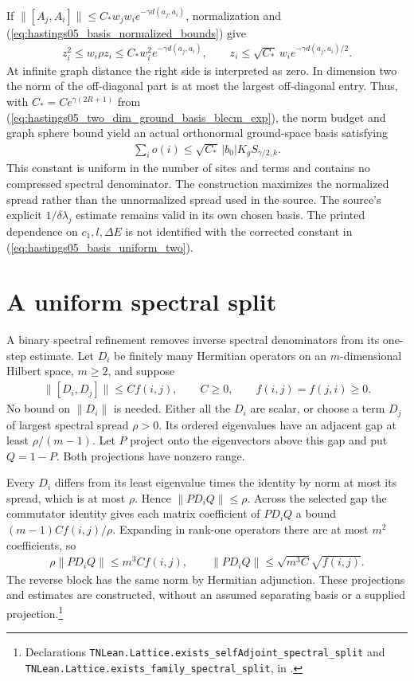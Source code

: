 \documentclass{article}
\providecommand{\leanid}[1]{\nolinkurl{#1}}
\begin{document}
If $\|[A_j,A_i]\|\le C_*w_jw_i e^{-\gamma d(a_j,a_i)}$, normalization and
(\ref{eq:hastings05_basis_normalized_bounds}) give
\begin{align}
 z_i^2\le w_i\rho z_i\le C_*w_i^2e^{-\gamma d(a_j,a_i)},
 \qquad z_i\le\sqrt{C_*}\,w_i e^{-\gamma d(a_j,a_i)/2}.
 \label{eq:hastings05_basis_half_decay}
\end{align}
At infinite graph distance the right side is interpreted as zero. In dimension
two the norm of the off-diagonal part is at most the largest off-diagonal entry.
Thus, with $C_*=Ce^{\gamma(2R+1)}$ from
(\ref{eq:hastings05_two_dim_ground_basis_blecm_exp}), the norm budget and graph
sphere bound yield an actual orthonormal ground-space basis satisfying
\begin{align}
 \sum_i o(i)\le\sqrt{C_*}\,|b_0|K_g S_{\gamma/2,k}.
 \label{eq:hastings05_basis_uniform_two}
\end{align}
This constant is uniform in the number of sites and terms and contains no
compressed spectral denominator. The construction maximizes the normalized
spread rather than the unnormalized spread used in the source. The source's
explicit $1/\delta\lambda_j$ estimate remains valid in its own chosen basis.
The printed dependence on $c_1,l,\Delta E$ is not identified with the corrected
constant in (\ref{eq:hastings05_basis_uniform_two}).

\section{A uniform spectral split}

A binary spectral refinement removes inverse spectral denominators from its
one-step estimate. Let $D_i$ be finitely many Hermitian operators on an
$m$-dimensional Hilbert space, $m\ge2$, and suppose
\begin{align}
 \|[D_i,D_j]\|\le C f(i,j),\qquad C\ge0,\qquad f(i,j)=f(j,i)\ge0.
 \label{eq:hastings05_basis_split_commutators}
\end{align}
No bound on $\|D_i\|$ is needed. Either all the $D_i$ are scalar, or choose a
term $D_j$ of largest spectral spread $\rho>0$. Its ordered eigenvalues have
an adjacent gap at least $\rho/(m-1)$. Let $P$ project onto the eigenvectors
above this gap and put $Q=1-P$. Both projections have nonzero range.

Every $D_i$ differs from its least eigenvalue times the identity by norm at
most its spread, which is at most $\rho$. Hence $\|PD_iQ\|\le\rho$.
Across the selected gap the commutator identity gives each matrix coefficient
of $PD_iQ$ a bound $(m-1)C f(i,j)/\rho$. Expanding in rank-one operators
there are at most $m^2$ coefficients, so
\begin{align}
 \rho\|PD_iQ\|\le m^3 C f(i,j),\qquad
 \|PD_iQ\|\le\sqrt{m^3 C}\sqrt{f(i,j)}.
 \label{eq:hastings05_basis_split_cross}
\end{align}
The reverse block has the same norm by Hermitian adjunction. These
projections and estimates are constructed, without an assumed separating
basis or a supplied projection.\footnote{Declarations
\leanid{TNLean.Lattice.exists_selfAdjoint_spectral_split} and
\leanid{TNLean.Lattice.exists_family_spectral_split}, in
.}
\end{document}
